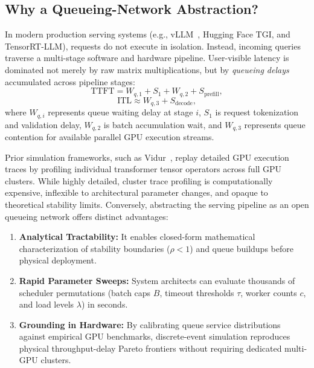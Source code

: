 \documentclass[conference]{IEEEtran}
\begin{document}
\subsection{Why a Queueing-Network Abstraction?}
In modern production serving systems (e.g., vLLM~\cite{kwon2023vllm}, Hugging Face TGI, and TensorRT-LLM), requests do not execute in isolation. Instead, incoming queries traverse a multi-stage software and hardware pipeline. User-visible latency is dominated not merely by raw matrix multiplications, but by \emph{queueing delays} accumulated across pipeline stages:
\begin{equation}
\text{TTFT} = W_{q,1} + S_1 + W_{q,2} + S_{\text{prefill}},
\end{equation}
\begin{equation}
\text{ITL} \approx W_{q,3} + S_{\text{decode}},
\end{equation}
where $W_{q,i}$ represents queue waiting delay at stage $i$, $S_1$ is request tokenization and validation delay, $W_{q,2}$ is batch accumulation wait, and $W_{q,3}$ represents queue contention for available parallel GPU execution streams.

Prior simulation frameworks, such as Vidur~\cite{agrawal2024vidur}, replay detailed GPU execution traces by profiling individual transformer tensor operators across full GPU clusters. While highly detailed, cluster trace profiling is computationally expensive, inflexible to architectural parameter changes, and opaque to theoretical stability limits. Conversely, abstracting the serving pipeline as an open queueing network offers distinct advantages:
\begin{enumerate}
    \item \textbf{Analytical Tractability:} It enables closed-form mathematical characterization of stability boundaries ($\rho < 1$) and queue buildups before physical deployment.
    \item \textbf{Rapid Parameter Sweeps:} System architects can evaluate thousands of scheduler permutations (batch caps $B$, timeout thresholds $\tau$, worker counts $c$, and load levels $\lambda$) in seconds.
    \item \textbf{Grounding in Hardware:} By calibrating queue service distributions against empirical GPU benchmarks, discrete-event simulation reproduces physical throughput-delay Pareto frontiers without requiring dedicated multi-GPU clusters.
\end{enumerate}
\end{document}

